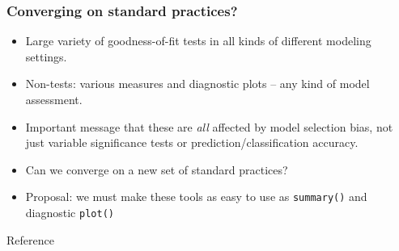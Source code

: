 \documentclass{beamer}
\begin{document}
\begin{frame}
\frametitle{Converging on standard practices?}
\begin{itemize}
\item Large variety of goodness-of-fit tests in all kinds of different modeling settings.
\item Non-tests: various measures and diagnostic plots -- any kind of model assessment.
\item Important message that these are \textit{all} affected by model selection bias, not just variable significance tests or prediction/classification accuracy.
\item Can we converge on a new set of standard practices?
\item Proposal: we must make these tools as easy to use as \texttt{summary()} and diagnostic \texttt{plot()}
\end{itemize}

\end{frame}


\begin{frame}{Reference}




  


\end{frame}
\end{document}
